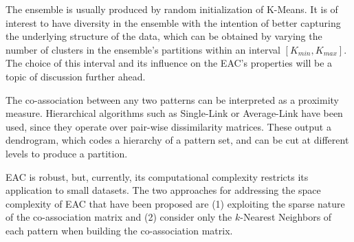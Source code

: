 The ensemble is usually produced by random initialization of K-Means. %
It is of interest to have diversity in the ensemble with the intention of better capturing the underlying structure of the data, which can be obtained by varying the number of clusters in the ensemble's partitions within an interval $[K_{min}, K_{max}]$.
The choice of this interval and its influence on the EAC's properties will be a topic of discussion further ahead.


The co-association between any two patterns can be interpreted as a proximity measure.
Hierarchical algorithms such as Single-Link or Average-Link have been used, since they operate over pair-wise dissimilarity matrices.
These output a dendrogram, which codes a hierarchy of a pattern set, and can be cut at different levels to produce a partition.

EAC is robust, but, currently, its computational complexity restricts its application to small datasets.
The two approaches for addressing the space complexity of EAC that have been proposed are (1) exploiting the sparse nature of the co-association matrix \cite{Lourenco2010} and (2) consider only the $k$-Nearest Neighbors of each pattern when building the co-association matrix.

